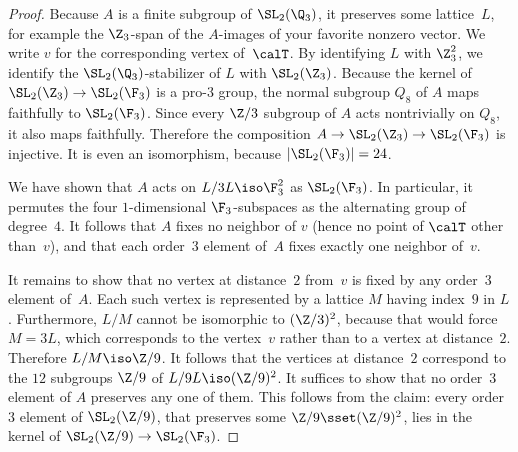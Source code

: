 \begin{proof}
Because $A$ is a finite subgroup of $\SL_2(\Q_3)$, it preserves some lattice~$L$, for example the $\Z_3$-span of the $A$-images of your favorite nonzero vector. We write $v$ for the corresponding vertex of~$\calT$. By identifying $L$ with $\Z_3^2$, we identify the $\SL_2(\Q_3)$-stabilizer of $L$ with $\SL_2(\Z_3)$. Because the kernel of $\SL_2(\Z_3)\to\SL_2(\F_3)$ is a pro-$3$ group, the normal subgroup $Q_8$ of $A$ maps faithfully to $\SL_2(\F_3)$. Since every $\Z/3$ subgroup of $A$ acts nontrivially on $Q_8$, it also maps faithfully. Therefore the composition $A\to\SL_2(\Z_3)\to\SL_2(\F_3)$ is injective. It is even an isomorphism, because $\mathopen|\SL_2(\F_3)|=24$.

We have shown that $A$ acts on $L/3L\iso\F_3^2$ as $\SL_2(\F_3)$. In particular, it permutes the four $1$-dimensional $\F_3$-subspaces as the alternating group of degree~$4$. It follows that $A$ fixes no neighbor of $v$ (hence no point of $\calT$ other than~$v$), and that each order~$3$ element of~$A$ fixes exactly one neighbor of~$v$.

It remains to show that no vertex at distance~$2$ from~$v$ is fixed by any order~$3$ element of~$A$. Each such vertex is represented by a lattice $M$ having index~$9$ in $L$. Furthermore, $L/M$ cannot be isomorphic to $(\Z/3)^2$, because that would force $M=3L$, which corresponds to the vertex~$v$ rather than to a vertex at distance~$2$. Therefore $L/M\iso\Z/9$. It follows that the vertices at distance~$2$ correspond to the $12$ subgroups $\Z/9$ of $L/9L\iso(\Z/9)^2$. It suffices to show that no order~$3$ element of $A$ preserves any one of them. This follows from the claim: every order~$3$ element of $\SL_2(\Z/9)$, that preserves some $\Z/9\sset(\Z/9)^2$, lies in the kernel of $\SL_2(\Z/9)\to\SL_2(\F_3)$.


\end{proof}

